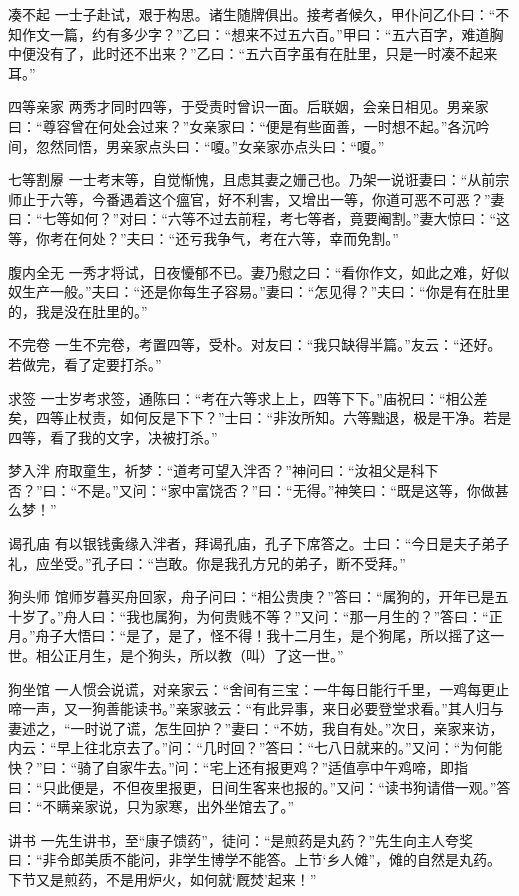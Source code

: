 \documentclass[12pt,UTF8]{ctexbook}
\begin{document}
凑不起
一士子赴试，艰于构思。诸生随牌俱出。接考者候久，甲仆问乙仆曰：“不知作文一篇，约有多少字？”乙曰：“想来不过五六百。”甲曰：“五六百字，难道胸中便没有了，此时还不出来？”乙曰：“五六百字虽有在肚里，只是一时凑不起来耳。”

四等亲家
两秀才同时四等，于受责时曾识一面。后联姻，会亲日相见。男亲家曰：“尊容曾在何处会过来？”女亲家曰：“便是有些面善，一时想不起。”各沉吟间，忽然同悟，男亲家点头曰：“嗄。”女亲家亦点头曰：“嗄。”

七等割屪
一士考末等，自觉惭愧，且虑其妻之姗己也。乃架一说诳妻曰：“从前宗师止于六等，今番遇着这个瘟官，好不利害，又增出一等，你道可恶不可恶？”妻曰：“七等如何？”对曰：“六等不过去前程，考七等者，竟要阉割。”妻大惊曰：“这等，你考在何处？”夫曰：“还亏我争气，考在六等，幸而免割。”

腹内全无
一秀才将试，日夜懮郁不已。妻乃慰之曰：“看你作文，如此之难，好似奴生产一般。”夫曰：“还是你每生子容易。”妻曰：“怎见得？”夫曰：“你是有在肚里的，我是没在肚里的。”

不完卷
一生不完卷，考置四等，受朴。对友曰：“我只缺得半篇。”友云：“还好。若做完，看了定要打杀。”

求签
一士岁考求签，通陈曰：“考在六等求上上，四等下下。”庙祝曰：“相公差矣，四等止杖责，如何反是下下？”士曰：“非汝所知。六等黜退，极是干净。若是四等，看了我的文字，决被打杀。”

梦入泮
府取童生，祈梦：“道考可望入泮否？”神问曰：“汝祖父是科下否？”曰：“不是。”又问：“家中富饶否？”曰：“无得。”神笑曰：“既是这等，你做甚么梦！”

谒孔庙
有以银钱夤缘入泮者，拜谒孔庙，孔子下席答之。士曰：“今日是夫子弟子礼，应坐受。”孔子曰：“岂敢。你是我孔方兄的弟子，断不受拜。”

狗头师
馆师岁暮买舟回家，舟子问曰：“相公贵庚？”答曰：“属狗的，开年已是五十岁了。”舟人曰：“我也属狗，为何贵贱不等？”又问：“那一月生的？”答曰：“正月。”舟子大悟曰：“是了，是了，怪不得！我十二月生，是个狗尾，所以摇了这一世。相公正月生，是个狗头，所以教（叫）了这一世。”

狗坐馆
一人惯会说谎，对亲家云：“舍间有三宝：一牛每日能行千里，一鸡每更止啼一声，又一狗善能读书。”亲家骇云：“有此异事，来日必要登堂求看。”其人归与妻述之，“一时说了谎，怎生回护？”妻曰：“不妨，我自有处。”次日，亲家来访，内云：“早上往北京去了。”问：“几时回？”答曰：“七八日就来的。”又问：“为何能快？”曰：“骑了自家牛去。”问：“宅上还有报更鸡？”适值亭中午鸡啼，即指曰：“只此便是，不但夜里报更，日间生客来也报的。”又问：“读书狗请借一观。”答曰：“不瞒亲家说，只为家寒，出外坐馆去了。”

讲书
一先生讲书，至“康子馈药”，徒问：“是煎药是丸药？”先生向主人夸奖曰：“非令郎美质不能问，非学生博学不能答。上节‘乡人傩”，傩的自然是丸药。下节又是煎药，不是用炉火，如何就‘厩焚’起来！”
\end{document}
